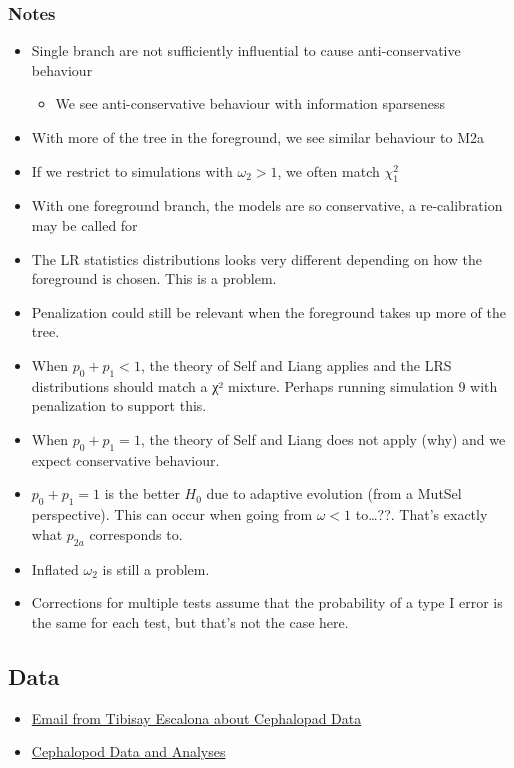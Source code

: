 \documentclass[11pt]{article}
\begin{document}
\subsubsection{Notes}
\label{sec:orgb860af1}
\begin{itemize}
\item Single branch are not sufficiently influential to cause anti-conservative
behaviour
\begin{itemize}
\item We see anti-conservative behaviour with information sparseness
\end{itemize}
\item With more of the tree in the foreground, we see similar behaviour to M2a
\item If we restrict to simulations with \(\omega_2>1\), we often match \(\chi^2_1\)
\item With one foreground branch, the models are so conservative, a
re-calibration may be called for
\item The LR statistics distributions looks very different depending on how the
foreground is chosen.  This is a problem.
\item Penalization could still be relevant when the foreground takes up more of
the tree.
\item When \(p_0+p_1<1\), the theory of Self and Liang applies and the LRS
distributions should match a χ² mixture.  Perhaps running simulation 9
with penalization to support this.
\item When \(p_0+p_1=1\), the theory of Self and Liang does not apply (why) and we
expect conservative behaviour.
\item \(p_0+p_1=1\) is the better \(H_0\) due to adaptive evolution (from a MutSel
perspective).  This can occur when going from \(\omega<1\) to\ldots{}??.  That's
exactly what \(p_{2a}\) corresponds to.
\item Inflated \(\omega_2\) is still a problem.
\item Corrections for multiple tests assume that the probability of a type I
error is the same for each test, but that's not the case here.
\end{itemize}

\subsection{Data}
\label{sec:org85573b2}
\begin{itemize}
\item \href{Dal\#CANiYCztS-ihazv3UnjOxOANHK35NT4Lf0OKL2\_gkaq5mdMHBiA@mail.gmail.com}{Email from Tibisay Escalona about Cephalopad Data}
\item \href{file:///home/jrm/scm/tibisay\_cephalopods/data/Data\_28May\_2019\_TE/}{Cephalopod Data and Analyses}
\end{itemize}
\end{document}
